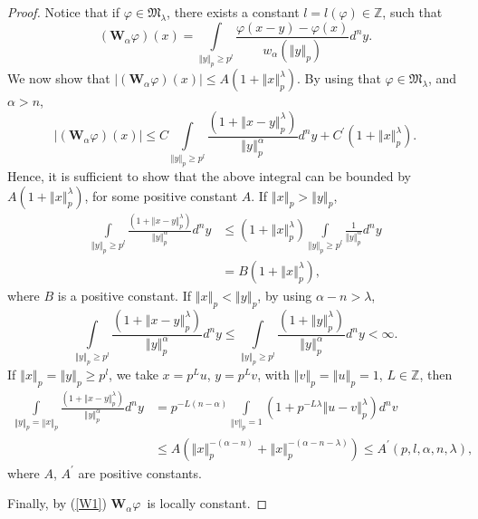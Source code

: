 \documentclass{amsart}\usepackage{amsfonts}
\theoremstyle{plain}
\numberwithin{equation}{section}
\begin{document}
\begin{proof}
Notice that if $\varphi\in\mathcal{\mathfrak{M}}_{\lambda}$, there exists a
constant $l=l\left(  \varphi\right)  \in\mathbb{Z}$, such that
\begin{equation}
(\boldsymbol{W}_{\alpha}\varphi)(x)={\int\limits_{\left\Vert y\right\Vert
_{p}\geq p^{l}}}\frac{\varphi\left(  x-y\right)  -\varphi\left(  x\right)
}{w_{\alpha}\left(  \left\Vert y\right\Vert _{p}\right)  }d^{n}y. \label{W1}\end{equation}
We now show that $\left\vert (\boldsymbol{W}_{\alpha}\varphi)(x)\right\vert
\leq A(1+\left\Vert x\right\Vert _{p}^{\lambda})$. By using that $\varphi
\in\mathcal{\mathfrak{M}}_{\lambda}$, and $\alpha>n$,\[
\left\vert (\boldsymbol{W}_{\alpha}\varphi)(x)\right\vert \leq C{\int
\limits_{\left\Vert y\right\Vert _{p}\geq p^{l}}}\frac{(1+\left\Vert
x-y\right\Vert _{p}^{\lambda})}{\left\Vert y\right\Vert _{p}^{\alpha}}d^{n}y+C^{\prime}(1+\left\Vert x\right\Vert _{p}^{\lambda}){.}\]
Hence, it is sufficient to show that the above integral can be bounded by
$A(1+\left\Vert x\right\Vert _{p}^{\lambda})$, for some positive constant $A$.
If $\left\Vert x\right\Vert _{p}>\left\Vert y\right\Vert _{p}$,
\begin{align*}
{\int\limits_{\left\Vert y\right\Vert _{p}\geq p^{l}}}\frac{(1+\left\Vert
x-y\right\Vert _{p}^{\lambda})}{\left\Vert y\right\Vert _{p}^{\alpha}}d^{n}y
&  \leq(1+\left\Vert x\right\Vert _{p}^{\lambda}){\int\limits_{\left\Vert
y\right\Vert _{p}\geq p^{l}}}\frac{1}{\left\Vert y\right\Vert _{p}^{\alpha}}d^{n}y\\
&  =B(1+\left\Vert x\right\Vert _{p}^{\lambda}),
\end{align*}
where $B$ is a positive constant. If $\left\Vert x\right\Vert _{p}<\left\Vert
y\right\Vert _{p}$, by using $\alpha-n>\lambda$,
\[
{\int\limits_{\left\Vert y\right\Vert _{p}\geq p^{l}}}\frac{(1+\left\Vert
x-y\right\Vert _{p}^{\lambda})}{\left\Vert y\right\Vert _{p}^{\alpha}}d^{n}y\leq{\int\limits_{\left\Vert y\right\Vert _{p}\geq p^{l}}}\frac{(1+\left\Vert y\right\Vert _{p}^{\lambda})}{\left\Vert y\right\Vert
_{p}^{\alpha}}d^{n}y<\infty.
\]
If $\left\Vert x\right\Vert _{p}=\left\Vert y\right\Vert _{p}\geq p^{l}$, we
take $x=p^{L}u$, $y=p^{L}v$, with $\left\Vert v\right\Vert _{p}=\left\Vert
u\right\Vert _{p}=1$, $L\in\mathbb{Z}$, then
\begin{align*}
{\int\limits_{\left\Vert y\right\Vert _{p}=\left\Vert x\right\Vert _{p}}}\frac{(1+\left\Vert x-y\right\Vert _{p}^{\lambda})}{\left\Vert y\right\Vert
_{p}^{\alpha}}d^{n}y  &  =p^{-L\left(  n-\alpha\right)  }{\int
\limits_{\left\Vert v\right\Vert _{p}=1}}(1+p^{-L\lambda}\left\Vert
u-v\right\Vert _{p}^{\lambda})d^{n}v\\
&  \leq A\left(  \left\Vert x\right\Vert _{p}^{-\left(  \alpha-n\right)
}+\left\Vert x\right\Vert _{p}^{-\left(  \alpha-n-\lambda\right)  }\right)
\leq A^{\prime}\left(  p,l,\alpha,n,\lambda\right)  ,
\end{align*}
where $A$, $A^{\prime}$ are positive constants.

Finally, by (\ref{W1}) $\boldsymbol{W}_{\alpha}\varphi$\ is locally constant.
\end{proof}
\end{document}
